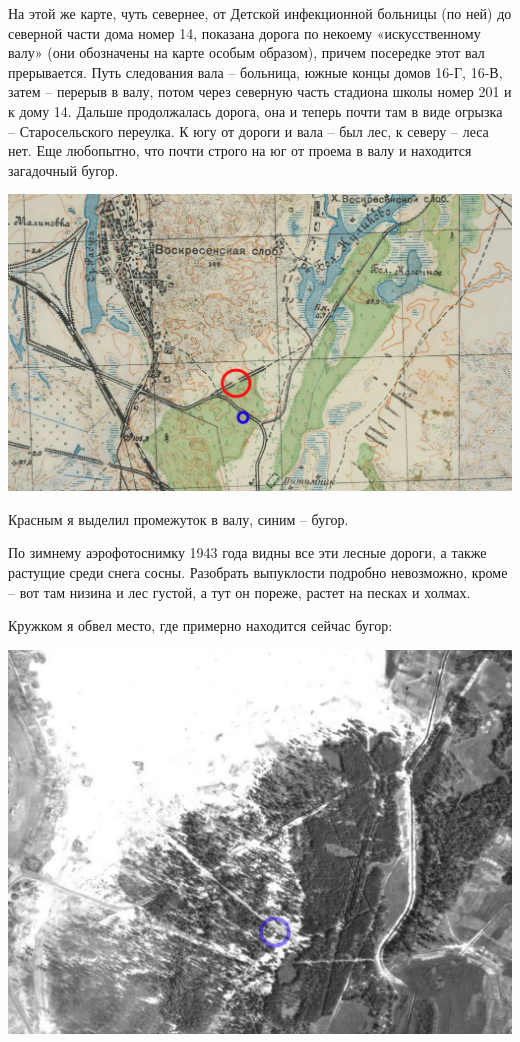 На этой же карте, чуть севернее, от Детской инфекционной больницы (по ней) до северной части дома номер 14, показана дорога по некоему «искусственному валу» (они обозначены на карте особым образом), причем посередке этот вал прерывается. Путь следования вала – больница, южные концы домов 16-Г, 16-В, затем – перерыв в валу, потом через северную часть стадиона школы номер 201 и к дому 14. Дальше продолжалась дорога, она и теперь почти там в виде огрызка – Старосельского переулка. К югу от дороги и вала – был лес, к северу – леса нет. Еще любопытно, что почти строго на юг от проема в валу и находится загадочный бугор.

\begin{center}
\includegraphics[width=\textwidth]{chast-gorodki/kurgany/rkka-bugor.jpg}
\end{center}

Красным я выделил промежуток в валу, синим – бугор.

По зимнему аэрофотоснимку 1943 года видны все эти лесные дороги, а также растущие среди снега сосны. Разобрать выпуклости подробно невозможно, кроме – вот там низина и лес густой, а тут он пореже, растет на песках и холмах.

Кружком я обвел место, где примерно находится сейчас бугор:

\begin{center}
\includegraphics[width=\textwidth]{chast-gorodki/kurgany/bu1943.jpg}
\end{center}

